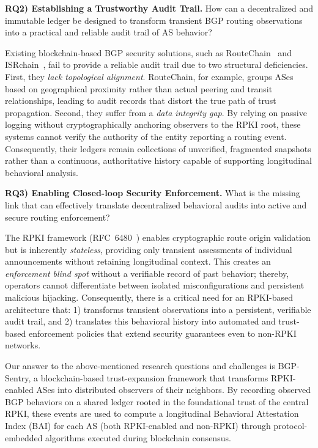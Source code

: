 \documentclass[conference]{IEEEtran}
\newcommand{\textbox}[2][]{%
  \begin{tcolorbox}[colback=white, colframe=black,
                    boxrule=0.5pt, arc=1mm, breakable, boxsep=2pt, left=1pt, right=1pt, top=1pt, bottom=1pt,  before skip=4pt, after skip=4pt, width=\linewidth, #1]
    #2
  \end{tcolorbox}%
}
\newcommand{\rj}[1]{{\color{blue}#1}}
\newcommand{\os}[1]{{\color{teal}#1}}
\begin{document}
\textbox{\textbf{RQ2) Establishing a Trustworthy Audit Trail.} How can a decentralized and immutable ledger be designed to transform transient BGP routing observations into a practical and reliable audit trail of AS behavior?}


Existing blockchain-based BGP security solutions, such as RouteChain~\cite{saad2022routechain} and ISRchain~\cite{chen2020isrchain}, fail to provide a reliable audit trail due to two structural deficiencies. \rj{First, they \textit{lack topological alignment}.} 
\os{RouteChain, for example, groups ASes based on geographical proximity rather than actual peering and transit relationships, leading to audit records that distort the true path of trust propagation.}
\rj{Second, they suffer from a \textit{data integrity gap}.} By relying on passive logging without cryptographically anchoring observers to the RPKI root, these systems cannot verify the authority of the entity reporting a routing event. Consequently, their ledgers remain collections of unverified, fragmented snapshots rather than a continuous, authoritative history capable of supporting longitudinal behavioral analysis.

\textbox{\textbf{RQ3) Enabling Closed-loop Security Enforcement.} What is the missing link that can effectively translate decentralized behavioral audits into active and secure routing enforcement?}


The RPKI framework (RFC~6480~\cite{RPKI}) enables cryptographic route origin validation but is inherently \textit{stateless}, providing only transient assessments of individual announcements without retaining longitudinal context. 
This creates an \rj{\textit{enforcement blind spot}} without a verifiable record of past behavior; thereby, operators cannot differentiate between isolated misconfigurations and persistent malicious hijacking. Consequently, there is a critical need for an RPKI-based architecture that: 1) transforms transient observations into a persistent, verifiable audit trail, and 2) translates this behavioral history into \rj{automated and trust-based enforcement policies} that extend security guarantees even to non-RPKI networks.




\rj{Our answer to the above-mentioned research questions and challenges is BGP-Sentry, a blockchain-based trust-expansion framework that transforms RPKI-enabled ASes into distributed observers of their neighbors. By recording observed BGP behaviors on a shared ledger rooted in the foundational trust of the central RPKI, these events are used to compute a longitudinal Behavioral Attestation Index (BAI) for each AS (both RPKI-enabled and non-RPKI) through protocol-embedded algorithms executed during blockchain consensus.}
\end{document}
